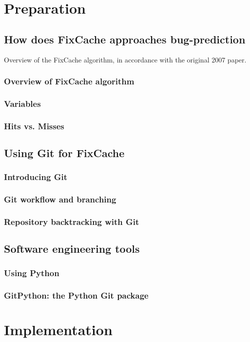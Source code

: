 \documentclass[12pt,twoside,notitlepage]{report}
\begin{document}
\chapter{Preparation}
\section{How does FixCache approaches bug-prediction}
Overview of the FixCache algorithm, in accordance with the original 2007 paper.
\subsection{Overview of FixCache algorithm}
\subsection{Variables}
\subsection{Hits vs. Misses}
\section{Using Git for FixCache}
\subsection{Introducing Git}
\subsection{Git workflow and branching}
\subsection{Repository backtracking with Git}
\section{Software engineering tools}
\subsection{Using Python}
\subsection{GitPython: the Python Git package}

\cleardoublepage
\chapter{Implementation}
\end{document}
